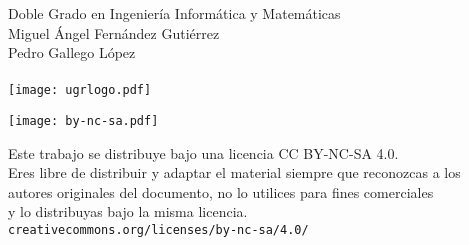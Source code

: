 \documentclass[10pt, a4paper]{article}
\theoremstyle{theorem-style}
\theoremstyle{theorem-style}
\theoremstyle{definition-style}
\theoremstyle{remark-style}
\theoremstyle{example-style}
\theoremstyle{definition-style}
\theoremstyle{remark-style}
\newcommand{\autor}{Miguel Ángel Fernández Gutiérrez\\Pedro Gallego López\\\hspace{1cm}}
\newcommand{\grado}{Doble Grado en Ingeniería Informática y Matemáticas}
\begin{document}

\afterpage{\restorepagecolor} %
\begin{titlepage}

	\parbox[t]{\textwidth}{
			\raggedright %
			\fontsize{40pt}{40pt}\selectfont\sffamily{}
	}

	\vfill

	\parbox[t]{\textwidth}{
		\raggedright %
		\sffamily\large\color{white}
		\grado\\
		{\Large \autor }\\[15pt]
		\texttt{[image: ugrlogo.pdf]}
	}

\end{titlepage}


\thispagestyle{empty}
\null
\vfill

\parbox[t]{\textwidth}{
  \texttt{[image: by-nc-sa.pdf]}\\[4pt]
  \raggedright %
  \sffamily\large
  {\Large Este trabajo se distribuye bajo una licencia CC BY-NC-SA 4.0.}\\[4pt]
  Eres libre de distribuir y adaptar el material siempre que reconozcas a los\\
  autores originales del documento, no lo utilices para fines comerciales\\
  y lo distribuyas bajo la misma licencia.\\[4pt]
  \texttt{creativecommons.org/licenses/by-nc-sa/4.0/}
}

\end{document}
